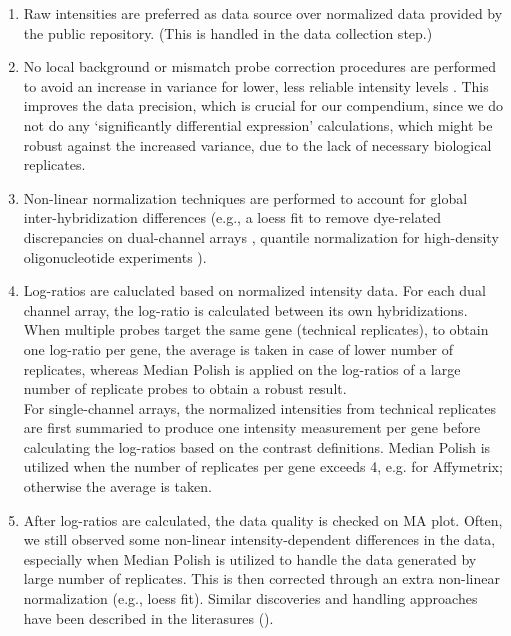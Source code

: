 \begin{enumerate}
\item Raw intensities are preferred as data source over normalized data
  provided by the public repository. (This is handled in the data collection
  step.)
%
\item No local background or mismatch probe correction procedures are
  performed to avoid an increase in variance for lower, less reliable
  intensity levels \cite{Ritchie2007, Irizarry2006, Engelen2006, Li2001}.
  This improves the data precision, which is crucial for our compendium, since
  we do not do any `significantly differential expression' calculations, which
  might be robust against the increased variance, due to the lack of necessary
  biological replicates.
%
\item Non-linear normalization techniques are performed to account for global
  inter-hybridization differences (e.g., a loess fit to remove dye-related
  discrepancies on dual-channel arrays \cite{Yang2002}, quantile normalization
  for high-density oligonucleotide experiments \cite{Bolstad2003}).
%
\item Log-ratios are caluclated based on normalized intensity data.
  For each dual channel array, the log-ratio is calculated between its
  own hybridizations.  When multiple probes target the same gene
  (technical replicates), to obtain one log-ratio per gene, the
  average is taken in case of lower number of replicates, whereas
  Median Polish is applied on the log-ratios of a large number of
  replicate probes to obtain a robust result. \vspace{1.5mm} \\
  For single-channel arrays, the normalized intensities from technical
  replicates are first summaried to produce one intensity measurement
  per gene before calculating the log-ratios based on the contrast
  definitions.  Median Polish is utilized when the number of
  replicates per gene exceeds 4, e.g. for Affymetrix; otherwise the
  average is taken.
%
\item After log-ratios are calculated, the data quality is checked on MA plot.
  Often, we still observed some non-linear intensity-dependent differences in
  the data, especially when Median Polish is utilized to handle the data
  generated by large number of replicates.  This is then corrected through an
  extra non-linear normalization (e.g., loess fit).  Similar discoveries and
  handling approaches have been described in the literasures (\cite{Choe2005,
    Welsh2013}).
\end{enumerate}
